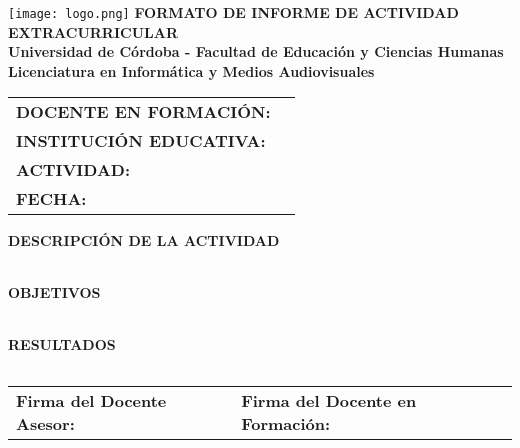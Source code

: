 \documentclass[a4paper,12pt]{article}
\begin{document}
\begin{center}
    \vspace*{1cm}
    \texttt{[image: logo.png]} %
    \vspace{0.5cm}
    \textbf{\Large FORMATO DE INFORME DE ACTIVIDAD EXTRACURRICULAR} \\
    \vspace{0.5cm}
    \textbf{Universidad de Córdoba - Facultad de Educación y Ciencias Humanas} \\
    \textbf{Licenciatura en Informática y Medios Audiovisuales}
\end{center}

\vspace{0.5cm}
\begin{tabularx}{\textwidth}{@{}p{5cm}X@{}}
    \toprule
    \textbf{DOCENTE EN FORMACIÓN:} & \hrulefill \\
    \textbf{INSTITUCIÓN EDUCATIVA:} & \hrulefill \\
    \textbf{ACTIVIDAD:} & \hrulefill \\
    \textbf{FECHA:} & \hrulefill \\
    \bottomrule
\end{tabularx}

\vspace{0.5cm}
\noindent
\textbf{DESCRIPCIÓN DE LA ACTIVIDAD}
\begin{tabularx}{\textwidth}{|X|}
    \hline
    \vspace{2cm} \\ \hline
\end{tabularx}

\vspace{0.5cm}
\noindent
\textbf{OBJETIVOS}
\begin{tabularx}{\textwidth}{|X|}
    \hline
    \vspace{2cm} \\ \hline
\end{tabularx}

\vspace{0.5cm}
\noindent
\textbf{RESULTADOS}
\begin{tabularx}{\textwidth}{|X|}
    \hline
    \vspace{2cm} \\ \hline
\end{tabularx}

\vspace{0.5cm}
\begin{center}
    \begin{tabular}{p{7cm}p{7cm}}
        \hline
        \textbf{Firma del Docente Asesor:} \hrulefill & \textbf{Firma del Docente en Formación:} \hrulefill \\
    \end{tabular}
\end{center}
\end{document}
